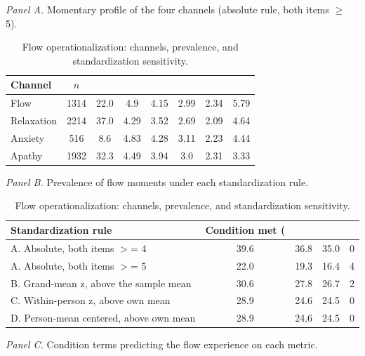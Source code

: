 \begin{table}[!htbp]
\raggedright
\caption{Flow operationalization: channels, prevalence, and standardization sensitivity.}
\label{tab:sup-flow}
\footnotesize
\begingroup
\setlength{\tabcolsep}{4pt}
\renewcommand{\arraystretch}{1.08}
\noindent\textit{Panel A.} Momentary profile of the four channels (absolute rule, both items $\geq$ 5).\par\vspace{2pt}
\begin{tabular*}{\textwidth}{@{\extracolsep{\fill}}lccccccc@{}}
\toprule
Channel & $n$ & \\%
\midrule
Flow & 1314 & 22.0 & 4.9 & 4.15 & 2.99 & 2.34 & 5.79 \\
Relaxation & 2214 & 37.0 & 4.29 & 3.52 & 2.69 & 2.09 & 4.64 \\
Anxiety & 516 & 8.6 & 4.83 & 4.28 & 3.11 & 2.23 & 4.44 \\
Apathy & 1932 & 32.3 & 4.49 & 3.94 & 3.0 & 2.31 & 3.33 \\
\bottomrule
\end{tabular*}
\par\vspace{6pt}\noindent\textit{Panel B.} Prevalence of flow moments under each standardization rule.\par\vspace{2pt}
\begin{tabular*}{\textwidth}{@{\extracolsep{\fill}}lcccc@{}}
\toprule
Standardization rule & Condition met (\\%
\midrule
A. Absolute, both items $>$= 4 & 39.6 & 36.8 & 35.0 & 0 \\
A. Absolute, both items $>$= 5 & 22.0 & 19.3 & 16.4 & 4 \\
B. Grand-mean z, above the sample mean & 30.6 & 27.8 & 26.7 & 2 \\
C. Within-person z, above own mean & 28.9 & 24.6 & 24.5 & 0 \\
D. Person-mean centered, above own mean & 28.9 & 24.6 & 24.5 & 0 \\
\bottomrule
\end{tabular*}
\par\vspace{6pt}\noindent\textit{Panel C.} Condition terms predicting the flow experience on each metric.\par\vspace{2pt}

\end{table}
